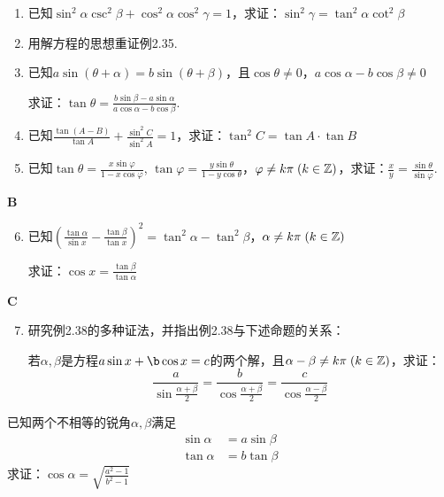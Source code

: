 \begin{enumerate}
    \item 已知$\sin^2\alpha\csc^2\beta+\cos^2\alpha\cos^2\gamma=1$，求证：$\sin^2\gamma=\tan^2\alpha\cot^2\beta$
\item 用解方程的思想重证例2.35.
\item 已知$a\sin(\theta+\alpha)=b\sin(\theta+\beta)$，且$\cos\theta\ne 0$，$a\cos\alpha-b\cos\beta\ne 0$

求证：$\tan\theta=\frac{b\sin\beta-a\sin\alpha}{a\cos\alpha-b\cos\beta}$.

\item 已知$\frac{\tan(A-B)}{\tan A}+\frac{\sin^2 C}{\sin^2 A}=1$，求证：$\tan^2 C=\tan A\cdot \tan B$
\item 已知$\tan\theta =\frac{x\sin\varphi}{1-x\cos\varphi} $, $\tan\varphi=\frac{y\sin\theta}{1-y\cos\theta}$，$\varphi\ne k\pi\; (k\in\mathbb{Z})$，求证：$\frac{x}{y}=\frac{\sin\theta}{\sin\varphi}$.
\end{enumerate}

\begin{center}
    \bfseries B
\end{center}

\begin{enumerate}\setcounter{enumi}{5}
    \item 已知$\left(\frac{\tan\alpha}{\sin x}-\frac{\tan\beta}{\tan x}\right)^2=\tan^2\alpha-\tan^2\beta$，$\alpha\ne k\pi\; (k\in\mathbb{Z})$

    求证：$\cos x=\frac{\tan\beta}{\tan\alpha}$
\end{enumerate}

\begin{center}
    \bfseries C
\end{center}

\begin{enumerate}\setcounter{enumi}{6}
    \item 研究例2.38的多种证法，并指出例2.38与下述命题的关系：

若$\alpha,\beta$是方程$a\sin x+\b\cos x=c$的两个解，且$\alpha-\beta\ne k\pi\; (k\in\mathbb{Z})$，求证：
\[\frac{a}{\sin\frac{\alpha+\beta}{2}}=\frac{b}{\cos\frac{\alpha+\beta}{2}}=\frac{c}{\cos\frac{\alpha-\beta}{2}}\]
\end{enumerate}

\begin{example}
已知两个不相等的锐角$\alpha,\beta$满足
\begin{align}
    \sin\alpha&=a\sin\beta \tag{1}\\
    \tan\alpha&=b\tan\beta \tag{2}
\end{align}
求证：$\cos\alpha=\sqrt{\frac{a^2-1}{b^2-1}}$
\end{example}

